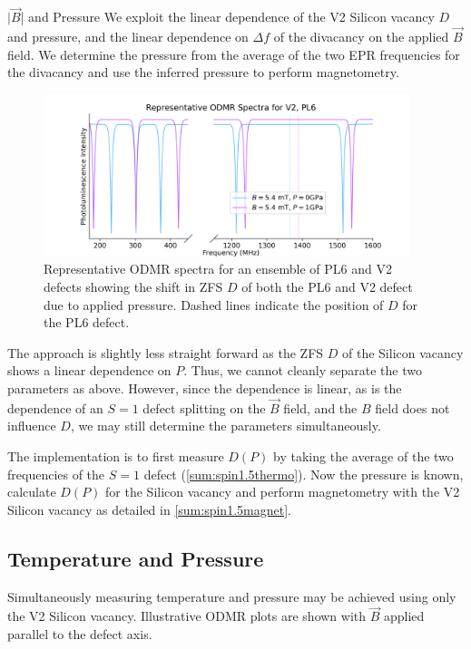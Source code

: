 \begin{proposal}{$|\vec{B}$| and Pressure}
	We exploit the linear dependence of the V2 Silicon vacancy $D$ and pressure, and the linear dependence on $\Delta f$ of the divacancy on the applied $\vec{B}$ field. We determine the pressure from the average of the two EPR frequencies for the divacancy and use the inferred pressure to perform magnetometry. 

\end{proposal}

\begin{figure}[h]
	\begin{center}
		\includegraphics[width=0.95\textwidth]{figures/ODMR-multimodal-s15magnet-s1P.png}
	\end{center}
	\caption{Representative ODMR spectra for an ensemble of PL6 and V2 defects showing the shift in ZFS $D$ of both the PL6 and V2 defect due to applied pressure. Dashed lines indicate the position of $D$ for the PL6 defect.}
    \label{fig:multimode_BP}
\end{figure}

The approach is slightly less straight forward as the ZFS $D$ of the Silicon vacancy shows a linear dependence on $P$. Thus, we cannot cleanly separate the two parameters as above. However, since the dependence is linear, as is the dependence of an $S=1$ defect splitting on the $\vec{B}$ field, and the $B$ field does not influence $D$, we may still determine the parameters simultaneously.

The implementation is to first measure $D(P)$ by taking the average of the two frequencies of the $S=1$ defect (\ref{sum:spin1.5thermo}). Now the pressure is known, calculate $D(P)$ for the Silicon vacancy and perform magnetometry with the V2 Silicon vacancy as detailed in \ref{sum:spin1.5magnet}.


\subsection{Temperature and Pressure}\label{multi_TP}
Simultaneously measuring temperature and pressure
may be achieved using only the V2 Silicon vacancy. Illustrative ODMR plots are shown with $\vec{B}$ applied parallel to the defect axis. 

